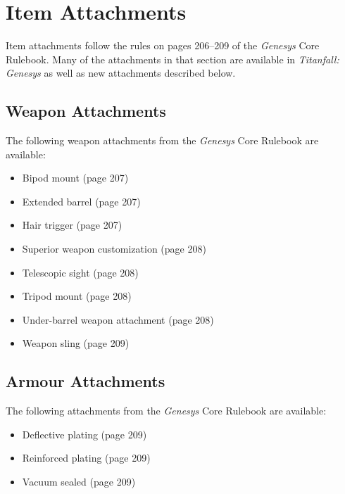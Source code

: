 \chapter{Item Attachments}
Item attachments follow the rules on pages 206--209 of the \emph{Genesys} Core Rulebook. Many of the attachments in that section are available in \emph{Titanfall: Genesys} as well as new attachments described below.

\section{Weapon Attachments}

The following weapon attachments from the \emph{Genesys} Core Rulebook are available:

\begin{itemize}[noitemsep]
\item Bipod mount (page 207)
\item Extended barrel (page 207)
\item Hair trigger (page 207)
\item Superior weapon customization (page 208)
\item Telescopic sight (page 208)
\item Tripod mount (page 208)
\item Under-barrel weapon attachment (page 208)
\item Weapon sling (page 209)
\end{itemize}

\section{Armour Attachments}
The following attachments from the \emph{Genesys} Core Rulebook are available:

\begin{itemize}[noitemsep]
\item Deflective plating (page 209)
\item Reinforced plating (page 209)
\item Vacuum sealed (page 209)
\end{itemize}
